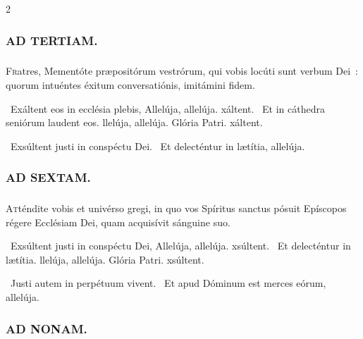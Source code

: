 \documentclass[9pt,twoside]{extarticle}
\begin{document}
\begin{multicols}{2}
\begin{tightlist}{}
\item {}
\end{tightlist}

\subsubsection*{\center \textsc{AD TERTIAM.}}
\subsubsection*{}
\lettrine{F}ratres, Mementóte præpositórum vestrórum, qui vobis locúti sunt verbum Dei~: quorum intuéntes éxitum conversatiónis, imitámini fidem.

\begin{tightlist}{}
\item {}~Exáltent eos in ecclésia plebis, \textred{*} Allelúja, allelúja. xáltent. ~Et in cáthedra seniórum laudent eos. llelúja, allelúja. Glória Patri. xáltent.
\item {}~Exsúltent justi in conspéctu Dei. ~Et delecténtur in lætítia, allelúja.
\end{tightlist}

\subsubsection*{\center \textsc{AD SEXTAM.}}
\subsubsection*{}
\lettrine{A}tténdite vobis et univérso gregi, in quo vos Spíritus sanctus pósuit Epíscopos régere Ecclésiam Dei, quam acquisívit sánguine suo.

\begin{tightlist}{}
\item {}~Exsúltent justi in conspéctu Dei, \textred{*} Allelúja, allelúja. xsúltent. ~Et delecténtur in lætítia. llelúja, allelúja. Glória Patri. xsúltent.
\item {}~Justi autem in perpétuum vivent. ~Et apud Dóminum est merces eórum, allelúja.
\end{tightlist}

\subsubsection*{\center \textsc{AD NONAM.}}

\end{multicols}
\end{document}
